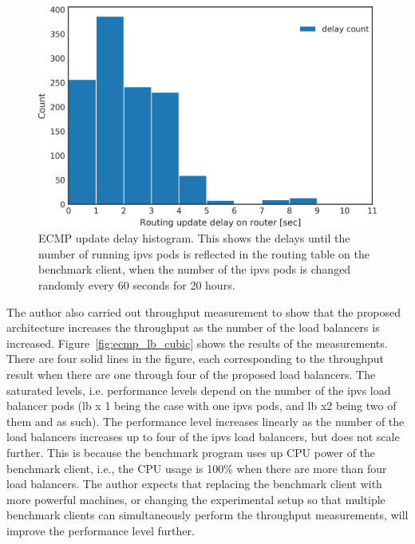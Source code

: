 \begin{figure}[h]
  \centering
  \includegraphics[width=0.9\columnwidth]{Figs/ecmp_delay_histgram}
  \par\bigskip
  \centering
  \begin{minipage}{0.9\columnwidth}
    \caption[ECMP update delay histogram]{
      ECMP update delay histogram.
      This shows the delays until the number of running ipvs pods is reflected in the routing table on the benchmark client, when the number of the ipvs pods is changed randomly every 60 seconds for 20 hours.
    }
    \label{fig:ecmp_delay_histgram}
  \end{minipage}
\end{figure}

The author also carried out throughput measurement to show that the proposed architecture increases the throughput as the number of the load balancers is increased.
Figure~\ref{fig:ecmp_lb_cubic} shows the results of the measurements.
There are four solid lines in the figure, each corresponding to the throughput result when there are one through four of the proposed load balancers.
The saturated levels, i.e. performance levels depend on the number of the ipvs load balancer pods (lb x 1 being the case with one ipvs pods, and lb x2 being two of them and as such). 
The performance level increases linearly as the number of the load balancers increases up to four of the ipvs load balancers, but does not scale further.
This is because the benchmark program uses up CPU power of the benchmark client, i.e., the CPU usage is 100\% when there are more than four load balancers.
The author expects that replacing the benchmark client with more powerful machines, or changing the experimental setup so that multiple benchmark clients can simultaneously perform the throughput measurements, will improve the performance level further.

